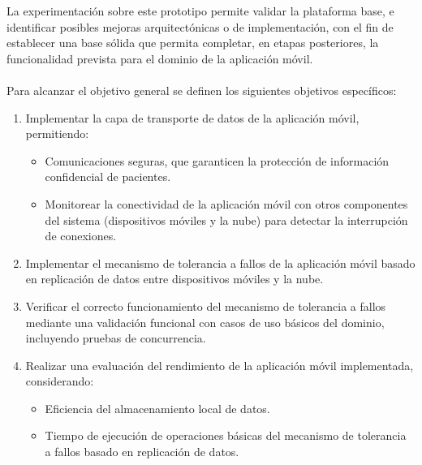 La experimentación sobre este prototipo permite validar la plataforma base, e identificar posibles mejoras arquitectónicas o de implementación, con el fin de establecer una base sólida que permita completar, en etapas posteriores, la funcionalidad prevista para el dominio de la aplicación móvil.
\\\\
Para alcanzar el objetivo general se definen los siguientes objetivos específicos:
\begin{enumerate}
    \item Implementar la capa de transporte de datos de la aplicación móvil, permitiendo:
    \begin{itemize}
        \item Comunicaciones seguras, que garanticen la protección de información confidencial de pacientes. 
        \item Monitorear la conectividad de la aplicación móvil con otros componentes del sistema (dispositivos móviles y la nube) para detectar la interrupción de conexiones.
    \end{itemize}
        

    \item Implementar el mecanismo de tolerancia a fallos de la aplicación móvil basado en replicación de datos entre dispositivos móviles y la nube.

    \item Verificar el correcto funcionamiento del mecanismo de tolerancia a fallos mediante una validación funcional con casos de uso básicos del dominio, incluyendo pruebas de concurrencia.
    
    \item Realizar una evaluación del rendimiento de la aplicación móvil implementada, considerando:
    \begin{itemize}
        \item Eficiencia del almacenamiento local de datos.
        \item Tiempo de ejecución de operaciones básicas del mecanismo de tolerancia a fallos basado en replicación de datos.
    \end{itemize}

    
\end{enumerate}



